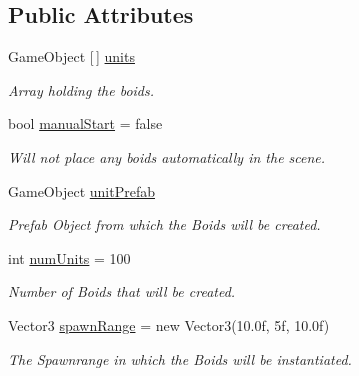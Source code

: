 \subsection*{Public Attributes}
\begin{DoxyCompactItemize}
\item 
\mbox{\label{class_f_unit_manager_af516b428d69f61e7373d2e223ba2a9a9}} 
Game\+Object \mbox{[}$\,$\mbox{]} \hyperlink{class_f_unit_manager_af516b428d69f61e7373d2e223ba2a9a9}{units}
\begin{DoxyCompactList}\small\item\em Array holding the boids. \end{DoxyCompactList}\item 
\mbox{\label{class_f_unit_manager_abdafb326f485fc9f68150a9a5d00ab6d}} 
bool \hyperlink{class_f_unit_manager_abdafb326f485fc9f68150a9a5d00ab6d}{manual\+Start} = false
\begin{DoxyCompactList}\small\item\em Will not place any boids automatically in the scene. \end{DoxyCompactList}\item 
\mbox{\label{class_f_unit_manager_a11b10c5e2eda939b9a408b878b0bf5d7}} 
Game\+Object \hyperlink{class_f_unit_manager_a11b10c5e2eda939b9a408b878b0bf5d7}{unit\+Prefab}
\begin{DoxyCompactList}\small\item\em Prefab Object from which the Boids will be created. \end{DoxyCompactList}\item 
\mbox{\label{class_f_unit_manager_a042d6edcb06e9b9c79c56e4cc722d385}} 
int \hyperlink{class_f_unit_manager_a042d6edcb06e9b9c79c56e4cc722d385}{num\+Units} = 100
\begin{DoxyCompactList}\small\item\em Number of Boids that will be created. \end{DoxyCompactList}\item 
\mbox{\label{class_f_unit_manager_a96ce82693289e9fded138cf1f59c4c40}} 
Vector3 \hyperlink{class_f_unit_manager_a96ce82693289e9fded138cf1f59c4c40}{spawn\+Range} = new Vector3(10.\+0f, 5f, 10.\+0f)
\begin{DoxyCompactList}\small\item\em The Spawnrange in which the Boids will be instantiated. \end{DoxyCompactList}\item 

\end{DoxyCompactItemize}
